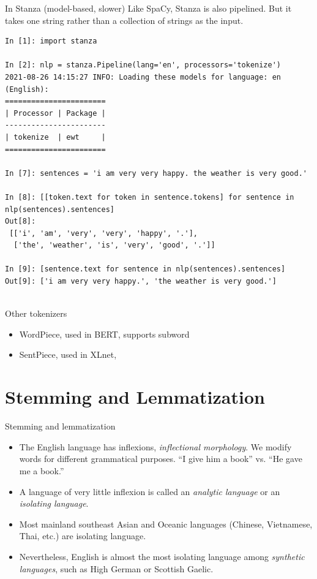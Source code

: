 \documentclass[11pt, handout]{beamer}
\begin{document}
\begin{frame}[fragile]{In Stanza (model-based, slower)}
Like SpaCy, Stanza is also pipelined. But it takes one string rather than a collection of strings as  the input. 

\tiny
\begin{verbatim}
In [1]: import stanza

In [2]: nlp = stanza.Pipeline(lang='en', processors='tokenize')
2021-08-26 14:15:27 INFO: Loading these models for language: en (English):
=======================
| Processor | Package |
-----------------------
| tokenize  | ewt     |
=======================

In [7]: sentences = 'i am very very happy. the weather is very good.'

In [8]: [[token.text for token in sentence.tokens] for sentence in nlp(sentences).sentences]
Out[8]: 
 [['i', 'am', 'very', 'very', 'happy', '.'],
  ['the', 'weather', 'is', 'very', 'good', '.']]

In [9]: [sentence.text for sentence in nlp(sentences).sentences]
Out[9]: ['i am very very happy.', 'the weather is very good.']
    
\end{verbatim}  
\end{frame}

\begin{frame}{Other tokenizers}
  \begin{itemize}
    \item WordPiece, used in BERT, supports subword 
    \item SentPiece, used in XLnet, 
  \end{itemize}
  
\end{frame}

\section{Stemming and Lemmatization}

\begin{frame}{Stemming and lemmatization}
 \begin{itemize}[<+->]
  \item The English language has inflexions, \textit{inflectional morphology}. We modify words for different grammatical purposes. ``I give him a book'' vs. ``He gave me a book.'' 
  \item A language of very little inflexion is called an \textit{analytic language} or an \textit{isolating language}. 
  \item Most mainland southeast Asian and Oceanic languages (Chinese, Vietnamese, Thai, etc.) are isolating language. 
  \item Nevertheless, English is almost the most isolating language among \textit{synthetic languages}, such as High German or Scottish Gaelic. 
 \end{itemize}
\end{frame}
\end{document}
